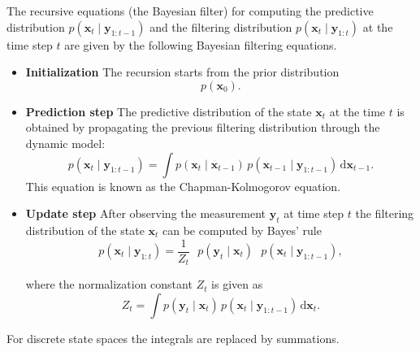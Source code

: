 \begin{theorem}\label{thm:bayes filtering eq}
The recursive equations (the Bayesian filter) for computing the predictive distribution $p(\mathbf{x}_t \mid \mathbf{y}_{1:t-1})$ and the filtering distribution $p(\mathbf{x}_t \mid \mathbf{y}_{1:t})$ at the time step $t$ are given by the following Bayesian filtering equations.
\begin{itemize}
    \item \textbf{Initialization} 
    The recursion starts from the prior distribution 
    \[
    p(\mathbf{x}_0).
    \]
    \item \textbf{Prediction step} 
    The predictive distribution of the state $\mathbf{x}_t$ at the time $t$ is obtained by propagating the previous filtering distribution through the dynamic model:
    \begin{equation}\label{eq: prediction step}
         p(\mathbf{x}_t \mid \mathbf{y}_{1:t-1}) = \int p(\mathbf{x}_t \mid \mathbf{x}_{t-1})\, p(\mathbf{x}_{t-1} \mid \mathbf{y}_{1:t-1})\, \mathrm{d}\mathbf{x}_{t-1}.
    \end{equation}
    This equation is known as the Chapman-Kolmogorov equation. 
    \item \textbf{Update step} 
    After observing the measurement $\mathbf{y}_t$ at time step $t$ the filtering distribution of the state $\mathbf{x}_t$ can be computed by Bayes' rule
    \begin{equation}\label{eq: update step}
        p(\mathbf{x}_t\mid \mathbf{y}_{1:t}) = \frac{1}{Z_t}\textbf{ }p(\mathbf{y}_t \mid \mathbf{x}_t)\textbf{ }p(\mathbf{x}_t\mid \mathbf{y}_{1:t-1}),
    \end{equation}

    where the normalization constant $Z_t$ is given as 
    \begin{equation}\label{eq: normalization constant}       
        Z_t = \int p(\mathbf{y}_t \mid \mathbf{x}_t) \, p(\mathbf{x}_t\mid \mathbf{y}_{1:t-1}) \, \mathrm{d}\mathbf{x}_t.
    \end{equation}
\end{itemize}
For discrete state spaces the integrals are replaced by summations.
\end{theorem}

